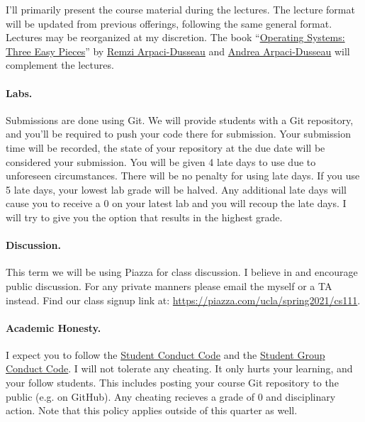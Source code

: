 \documentclass[12pt]{article}
\begin{document}
I'll primarily present the course material during the lectures.
The lecture format will be updated from previous offerings, following the same
general format.
Lectures may be reorganized at my discretion.
The book
``\href{https://pages.cs.wisc.edu/~remzi/OSTEP/}
       {Operating Systems: Three Easy Pieces}''
by \href{http://www.cs.wisc.edu/~remzi}{Remzi Arpaci-Dusseau}
and \href{http://www.cs.wisc.edu/~dusseau}{Andrea Arpaci-Dusseau}
will complement the lectures.

\paragraph{Labs.}

Submissions are done using Git.
We will provide students with a Git repository, and you'll be required to
push your code there for submission.
Your submission time will be recorded, the state of your repository at the due
date will be considered your submission.
You will be given 4 late days to use due to unforeseen circumstances.
There will be no penalty for using late days.
If you use 5 late days, your lowest lab grade will be halved.
Any additional late days will cause you to receive a 0 on your latest lab and
you will recoup the late days.
I will try to give you the option that results in the highest grade.

\paragraph{Discussion.}

This term we will be using Piazza for class discussion.
I believe in and encourage public discussion.
For any private manners please email the myself or a TA instead.
Find our class signup link at: \url{https://piazza.com/ucla/spring2021/cs111}.

\paragraph{Academic Honesty.}

I expect you to follow the
\href{https://deanofstudents.ucla.edu/individual-student-code}
     {Student Conduct Code}
and the
\href{https://deanofstudents.ucla.edu/group-student-code}
     {Student Group Conduct Code}.
I will not tolerate any cheating.
It only hurts your learning, and your follow students.
This includes posting your course Git repository to the public
(e.g. on GitHub).
Any cheating recieves a grade of 0 and disciplinary action.
Note that this policy applies outside of this quarter as well.
\end{document}
